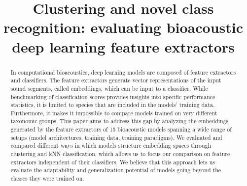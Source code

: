 \documentclass[11pt]{article}
\title{Clustering and novel class recognition: evaluating bioacoustic deep learning feature extractors}
\begin{document}
%
\maketitle
\begin{abstract}
In computational bioacoustics, deep learning models are composed of feature extractors and classifiers. 
The feature extractors generate vector representations of the input sound segments, called embeddings, which can be input to a classifier. 
While benchmarking of classification scores provides insights into specific performance statistics, it is limited to species that are included in the models' training data. Furthermore, it makes it impossible to compare models trained on very different taxonomic groups. 
This paper aims to address this gap by analyzing the embeddings generated by the feature extractors of 15 bioacoustic models spanning a wide range of setups (model architectures, training data, training paradigms). 
We evaluated and compared different ways in which models structure embedding spaces through clustering and kNN classification, which allows us to focus our comparison on feature extractors independent of their classifiers. 
We believe that this approach lets us evaluate the adaptability and generalization potential of models going beyond the classes they were trained on.
\end{abstract}
\end{document}
